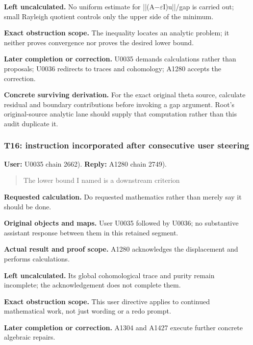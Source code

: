 \documentclass[10pt,a4paper,oneside]{report}
\begin{document}
\textbf{Left uncalculated.} No uniform estimate for
||(A\allowbreak{}\ensuremath{−}\allowbreak{}\allowbreak{}\ensuremath{ε}\allowbreak{}I)u||/gap
is carried out; small Rayleigh quotient controls only the upper side of
the minimum.

\textbf{Exact obstruction scope.} The inequality locates an analytic
problem; it neither proves convergence nor proves the desired lower
bound.

\textbf{Later completion or correction.} U0035 demands calculations
rather than proposals; U0036 redirects to traces and cohomology; A1280
accepts the correction.

\textbf{Concrete surviving derivation.} For the exact original theta
source, calculate residual and boundary contributions before invoking a
gap argument. Root's original-source analytic lane should supply that
computation rather than this audit duplicate it.

\subsubsection{T16: instruction incorporated after consecutive user
steering}\label{t16-instruction-incorporated-after-consecutive-user-steering}

\textbf{User:} U0035
\protect{} chain 2662).
\textbf{Reply:} A1280
\protect{} chain 2749).

\begin{quote}
The lower bound I named is a downstream criterion
\end{quote}

\textbf{Requested calculation.} Do requested mathematics rather than
merely say it should be done.

\textbf{Original objects and maps.} User U0035 followed by U0036; no
substantive assistant response between them in this retained segment.

\textbf{Actual result and proof scope.} A1280 acknowledges the
displacement and performs
\protect{}
calculations.

\textbf{Left uncalculated.} Its global cohomological trace and purity
remain incomplete; the acknowledgement does not complete them.

\textbf{Exact obstruction scope.} This user directive applies to
continued mathematical work, not just wording or a redo prompt.

\textbf{Later completion or correction.} A1304 and A1427 execute further
concrete algebraic repairs.
\end{document}
